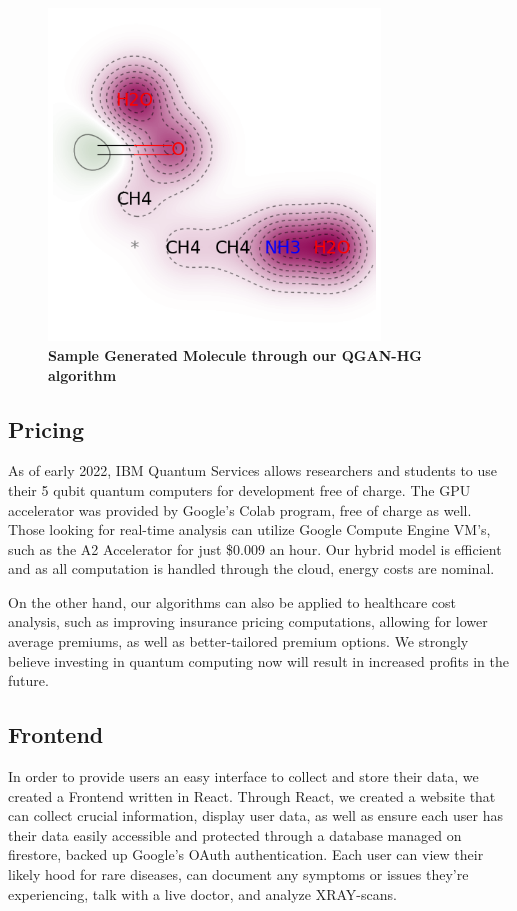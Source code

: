 \documentclass{scrartcl}
\begin{document}
\begin{figure}[htbp]
\centering
\includegraphics[width=250pt]{./assets/output4.png}
\caption{\textbf{Sample Generated Molecule through our QGAN-HG algorithm}}
\end{figure}

\subsection{Pricing}
\label{sec:org1362d9f}

As of early 2022, IBM Quantum Services allows researchers and students to use their 5 qubit quantum computers for development free of charge. The GPU accelerator was provided by Google's Colab program, free of charge as well. Those looking for real-time analysis can utilize Google Compute Engine VM's, such as the A2 Accelerator for just \$0.009 an hour. Our hybrid model is efficient and as all computation is handled through the cloud, energy costs are nominal.

On the other hand, our algorithms can also be applied to healthcare cost analysis, such as improving insurance pricing computations, allowing for lower average premiums, as well as better-tailored premium options. We strongly believe investing in quantum computing now will result in increased profits in the future.

\subsection{Frontend}
\label{sec:orga20beeb}

In order to provide users an easy interface to collect and store their data, we created a Frontend written in React. Through React, we created a website that can collect crucial information, display user data, as well as ensure each user has their data easily accessible and protected through a database managed on firestore, backed up Google's OAuth authentication. Each user can view their likely hood for rare diseases, can document any symptoms or issues they're experiencing, talk with a live doctor, and analyze XRAY-scans.
\end{document}
